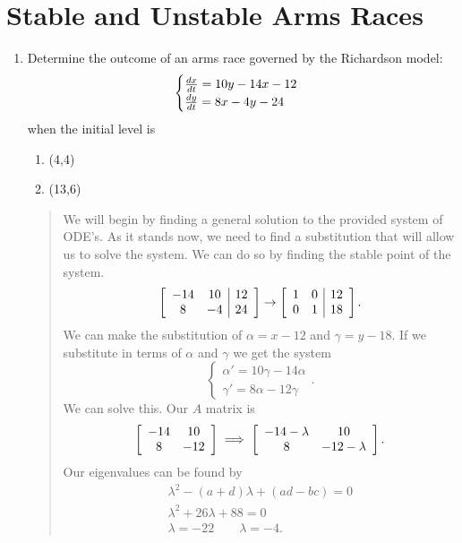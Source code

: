 \documentclass{hw}
\begin{document}
\newpage
\section{Stable and Unstable Arms Races}
\begin{enumerate}
\item Determine the outcome of an arms race governed by the Richardson model:
\[
\begin{cases}
{dx\over dt}=10y-14x-12\\
{dy\over dt}=8x-4y-24
\end{cases}
\]
when the initial level is
\begin{enumerate}
\item (4,4)
\item (13,6)
\end{enumerate}
\begin{quote}
We will begin by finding a general solution to the provided system of ODE's. As it stands now, we
need to find a substitution that will allow us to solve the system. We can do so by finding the stable
point of the system.
\[
\left[
\begin{array}{c c | c}
-14 & 10 & 12\\
8 & -4 & 24
\end{array}
\right]
\to
\left[
\begin{array}{c c | c}
1 & 0 & 12\\
0 & 1 & 18
\end{array}
\right].
\]
We can make the substitution of $\alpha = x - 12$ and $\gamma = y - 18$. If we substitute in terms
of $\alpha$ and $\gamma$ we get the system
\[
\begin{cases}
\alpha' = 10\gamma - 14\alpha\\
\gamma' = 8\alpha - 12\gamma
\end{cases}.
\]
We can solve this. Our $A$ matrix is
\[
\left[
\begin{array}{c c}
-14 & 10\\
8 & -12
\end{array}
\right]
\implies
\left[
\begin{array}{c c}
-14-\lambda & 10\\
8 & -12-\lambda
\end{array}
\right].
\]
Our eigenvalues can be found by
\begin{gather*}
\lambda^2 -(a+d)\lambda+(ad-bc) = 0\\
\lambda^2 + 26\lambda+88 = 0\\
\lambda = -22\qquad \lambda = -4.
\end{gather*}

\end{quote}
\end{enumerate}
\end{document}
